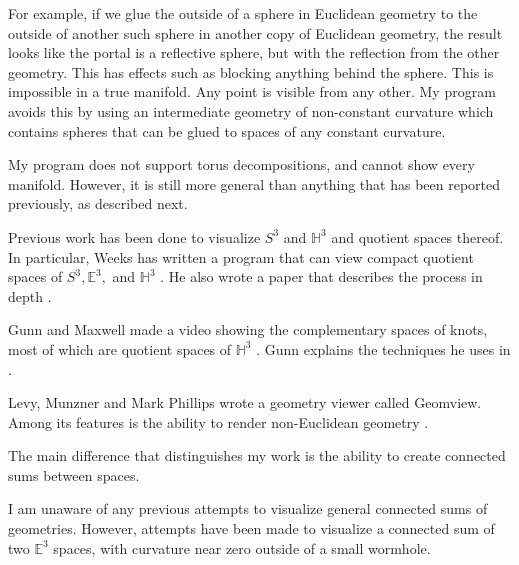 For example, if we glue the outside of a sphere in Euclidean geometry to the outside of another such sphere in another copy of Euclidean geometry, the result looks like the portal is a reflective sphere, but with the reflection from the other geometry. This has effects such as blocking anything behind the sphere. This is impossible in a true manifold. Any point is visible from any other. My program avoids this by using an intermediate geometry of non-constant curvature which contains spheres that can be glued to spaces of any constant curvature.

My program does not support torus decompositions, and cannot show every manifold. However, it is still more general than anything that has been reported previously, as described next.






Previous work has been done to visualize $S^3$ and $\mathbb{H}^3$ and quotient spaces thereof. In particular, Weeks has written a program that can view compact quotient spaces of $S^3, \mathbb{E}^3,$ and $\mathbb{H}^3$ \cite{CurvedSpaces}. He also wrote a paper that describes the process in depth \cite{CurvedSpacesPaper}.

Gunn and Maxwell made a video showing the complementary spaces of knots, most of which are quotient spaces of $\mathbb{H}^3$ \cite{NotKnot}. Gunn explains the techniques he uses in \cite{CharlieGunn} \cite{CharlieGunn2}.

Levy, Munzner and Mark Phillips wrote a geometry viewer called Geomview. Among its features is the ability to render non-Euclidean geometry \cite{Geomview}.

The main difference that distinguishes my work is the ability to create connected sums between spaces.



I am unaware of any previous attempts to visualize general connected sums of geometries. However, attempts have been made to visualize a connected sum of two $\mathbb{E}^3$ spaces, with curvature near zero outside of a small wormhole.

